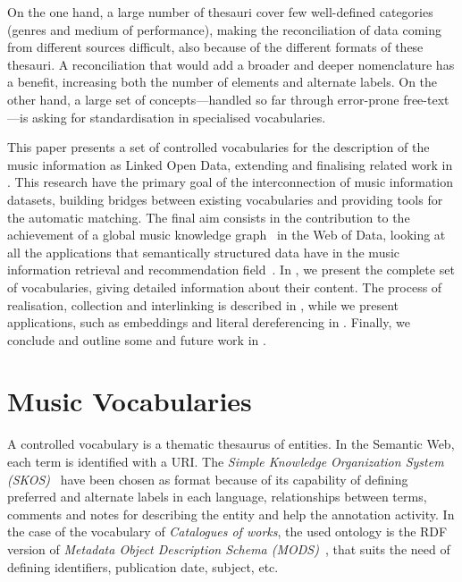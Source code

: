 \documentclass{article}
\newcommand{\etc}{etc.}
\begin{document}
On the one hand, a large number of thesauri cover few well-defined categories (genres and medium of performance), making the reconciliation of data coming from different sources difficult, also because of the different formats of these thesauri. A reconciliation that would add a broader and deeper nomenclature has a benefit, increasing both the number of elements and alternate labels. On the other hand, a large set of concepts---handled so far through error-prone free-text---is asking for standardisation in specialised vocabularies.

This paper presents a set of controlled vocabularies for the description of the music information as Linked Open Data, extending and finalising related work in \cite{lisena2017modeling}. 
This research have the primary goal of the interconnection of music information datasets, building bridges between existing vocabularies and providing tools for the automatic matching. The final aim consists in the contribution to the achievement of a global music knowledge graph~\cite{doremusGraph} in the Web of Data, looking at all the applications that semantically structured data have in the music information retrieval and recommendation field~\cite{oramas2016recKG, oramas2017cold, Weigl2017AFF, MusicLynx}.
In , we present the complete set of vocabularies, giving detailed information about their content. The process of realisation, collection and interlinking is described in , while we present applications, such as embeddings and literal dereferencing in . Finally, we conclude and outline some and future work in .


\section{Music Vocabularies}\label{sec:vocabularies}
A controlled vocabulary is a thematic thesaurus of entities. In the Semantic Web, each term is identified with a URI. The \textit{Simple Knowledge Organization System (SKOS)}~\cite{miles2007skos} have been chosen as format because of its capability of defining preferred and alternate labels in each language, relationships between terms, comments and notes for describing the entity and help the annotation activity.
In the case of the vocabulary of \textit{Catalogues of works}, the used ontology is the RDF version of \textit{Metadata Object Description Schema (MODS)}~\cite{mods-specification}, that suits the need of defining identifiers, publication date, subject, \etc
\end{document}
